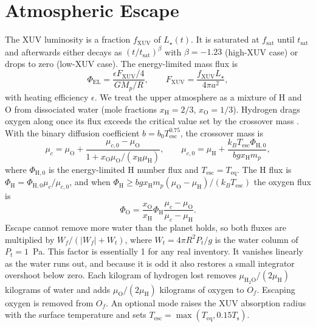 \documentclass[11pt]{article}
\newcommand{\Ts}{T_\mathrm{s}}
\newcommand{\Teq}{T_\mathrm{eq}}
\begin{document}
\section{Atmospheric Escape}\label{sec:escape}

The XUV luminosity is a fraction $f_\mathrm{XUV}$ of $L_\star(t)$. It is saturated at $f_\mathrm{sat}$ until $t_\mathrm{sat}$ and afterwards either decays as $(t / t_\mathrm{sat})^{\beta}$ with $\beta = -1.23$ \citep{Ribas2005} (high-XUV case) or drops to zero (low-XUV case). The energy-limited mass flux is \citep{Watson1981}
\begin{equation}
\Phi_\mathrm{EL} = \frac{\epsilon F_\mathrm{XUV} / 4}{G M_p / R}, \qquad F_\mathrm{XUV} = \frac{f_\mathrm{XUV} L_\star}{4 \pi a^2},
\end{equation}
with heating efficiency $\epsilon$. We treat the upper atmosphere as a mixture of H and O from dissociated water (mole fractions $x_\mathrm{H} = 2/3$, $x_\mathrm{O} = 1/3$). Hydrogen drags oxygen along once its flux exceeds the critical value set by the crossover mass \citep{Hunten1987,Luger2015}. With the binary diffusion coefficient $b = b_0 T_\mathrm{esc}^{0.75}$, the crossover mass is
\begin{equation}
\mu_c = \mu_\mathrm{O} + \frac{\mu_{c,0} - \mu_\mathrm{O}}{1 + x_\mathrm{O} \mu_\mathrm{O} / (x_\mathrm{H} \mu_\mathrm{H})},
\qquad \mu_{c,0} = \mu_\mathrm{H} + \frac{k_B T_\mathrm{esc} \Phi_{\mathrm{H},0}}{b g x_\mathrm{H} m_p},
\end{equation}
where $\Phi_{\mathrm{H},0}$ is the energy-limited H number flux and $T_\mathrm{esc} = \Teq$. The H flux is $\Phi_\mathrm{H} = \Phi_{\mathrm{H},0} \mu_c / \mu_{c,0}$, and when $\Phi_\mathrm{H} \ge b g x_\mathrm{H} m_p (\mu_\mathrm{O} - \mu_\mathrm{H}) / (k_B T_\mathrm{esc})$ the oxygen flux is
\begin{equation}
\Phi_\mathrm{O} = \frac{x_\mathrm{O}}{x_\mathrm{H}} \Phi_\mathrm{H} \frac{\mu_c - \mu_\mathrm{O}}{\mu_c - \mu_\mathrm{H}}.
\end{equation}
Escape cannot remove more water than the planet holds, so both fluxes are multiplied by $W_f / (|W_f| + W_t)$, where $W_t = 4 \pi R^2 P_t / g$ is the water column of $P_t = 1$~Pa. This factor is essentially 1 for any real inventory. It vanishes linearly as the water runs out, and because it is odd it also restores a small integrator overshoot below zero. Each kilogram of hydrogen lost removes $\mu_{\mathrm{H_2O}} / (2 \mu_\mathrm{H})$ kilograms of water and adds $\mu_\mathrm{O} / (2 \mu_\mathrm{H})$ kilograms of oxygen to $O_f$. Escaping oxygen is removed from $O_f$. An optional mode raises the XUV absorption radius with the surface temperature and sets $T_\mathrm{esc} = \max(\Teq, 0.15 \Ts)$.
\end{document}
